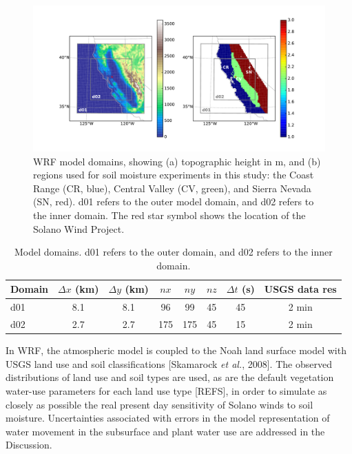 \begin{figure}[here]
\includegraphics[width=1\textwidth]{ch3-wind/img/domain_map_cropped.pdf}
\caption{WRF model domains, showing (a) topographic height in m, and (b) regions used for soil moisture experiments in this study: the Coast Range (CR, blue), Central Valley (CV, green), and Sierra Nevada (SN, red). d01 refers to the outer model domain, and d02 refers to the inner domain.  The red star symbol shows the location of the Solano Wind Project.}
\label{fig:windSol_domainmap}
\end{figure}

\begin{table}
\begin{tabular}{ l c c c c c c c }
\hline
Domain & $\Delta x$ (km) & $\Delta y$ (km) & $nx$ & $ny$ & $nz$ & $\Delta t$ (s) & USGS data res \\ \hline
d01 & 8.1 & 8.1 & 96 & 99 & 45 & 45 & 2 min\\
d02 & 2.7 & 2.7 & 175 & 175 & 45 & 15 & 2 min\\
\hline
\end{tabular}
\caption{Model domains. d01 refers to the outer domain, and d02 refers to the inner domain.}
\label{table:windSol_domains}
\end{table}

In WRF, the atmospheric model is coupled to the Noah land surface model with USGS land use and soil classifications [Skamarock \textit{et al.}, 2008].  The observed distributions of land use and soil types are used, as are the default vegetation water-use parameters for each land use type [REFS], in order to simulate as closely as possible the real present day sensitivity of Solano winds to soil moisture.  Uncertainties associated with errors in the model representation of water movement in the subsurface and plant water use are addressed in the Discussion. 

